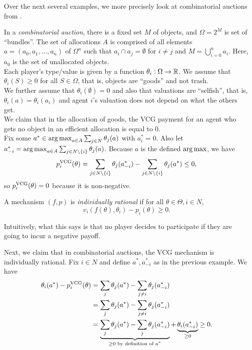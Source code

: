 		Over the next several examples, we more precisely look at combinatorial auctions from .

		\begin{fex}
			In a \emph{combinatorial auction}, there is a fixed set $M$ of objects, and $\Omega = 2^M$ is set of ``bundles''. The set of allocations $A$ is comprised of all elements $a = (a_0,a_1,\ldots,a_n)$ of $\Omega^n$ such that $a_i \cap a_j = \emptyset$ for $i \ne j$ and $M = \bigcup_{i=0}^n a_i$. Here, $a_0$ is the set of unallocated objects. \\
			Each player's type/value is given by a function $\theta_i : \Omega \to \mathbb{R}$. We assume that $\theta_i(S) \ge 0$ for all $S \in \Omega$, that is, objects are ``goods'' and not trash.\\
			We further assume that $\theta_i(\emptyset) = 0$ and also that valuations are ``selfish'', that is, $\theta_i(a) = \theta_i(a_i)$ and agent $i$'s valuation does not depend on what the others get.\\

			We claim that in the allocation of goods, the VCG payment for an agent who gets no object in an efficient allocation is equal to $0$.\\
			Fix some $a^* \in \operatorname*{arg\,max}_{a \in A} \sum_{j \in N} \theta_j(a)$ with $a^*_i = 0$. Also let $a^*_{-i} = \operatorname*{arg\,max}_{a \in A} \sum_{j \in N \setminus \{i\}} \theta_j(a)$. Because $a$ is the defined $\operatorname*{arg\,max}$, we have
			\[ p_i^{\text{VCG}}(\theta) = \sum_{j \in N \setminus \{i\}} \theta_j(a^*_{-i}) - \sum_{j \in N \setminus \{i\}} \theta_j(a^*) \le 0, \]
			so $p_i^{\text{VCG}}(\theta) = 0$ because it is non-negative.
		\end{fex}

		\begin{fdef}
			A mechanism $(f,p)$ is \emph{individually rational} if for all $\theta \in \Theta, i \in N$,
			\[ v_i(f(\theta),\theta_i) - p_i(\theta) \ge 0. \]
		\end{fdef}
		Intuitively, what this says is that no player decides to participate if they are going to incur a negative payoff.

		\begin{fex}
			Next, we claim that in combinatorial auctions, the VCG mechanism is individually rational. Fix $i \in N$ and define $a^*,a^*_{-i}$ as in the previous example. We have
			\begin{align*}
				\theta_i(a^*) - p_i^{\text{VCG}}(\theta) &= \sum_{j} \theta_j(a^*) - \sum_{j \ne i} \theta_j(a_{-i}^*) \\
					&= \sum_{j} \theta_j(a^*) - \sum_{j \ne i} \theta_j(a_{-i}^*) \\
					&= \underbrace{\sum_{j} \theta_j(a^*) - \sum_{j} \theta_j(a_{-i}^*)}_{\ge 0\text{ by definition of $a^*$}} + \underbrace{\theta_i(a_{-i}^*)}_{\ge 0} \ge 0.
			\end{align*}
		\end{fex}

